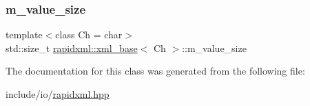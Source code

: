 \subsubsection{\texorpdfstring{m\_value\_size}{m\_value\_size}}
{\footnotesize\ttfamily template$<$class Ch  = char$>$ \\
std\+::size\+\_\+t \mbox{\hyperlink{classrapidxml_1_1xml__base}{rapidxml\+::xml\+\_\+base}}$<$ Ch $>$\+::m\+\_\+value\+\_\+size\hspace{0.3cm}{\ttfamily [protected]}}



The documentation for this class was generated from the following file\+:\begin{DoxyCompactItemize}
\item 
include/io/\mbox{\hyperlink{rapidxml_8hpp}{rapidxml.\+hpp}}\end{DoxyCompactItemize}
